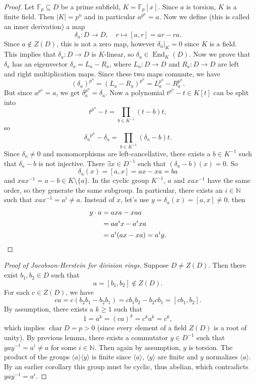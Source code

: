 \documentclass[10pt, a4paper]{article}
\newenvironment{noticeC}{%
  \tcolorbox[%
  notitle,
  empty,
  enhanced,  %
  breakable,
  coltext=black, 
  fontupper=\rmfamily,
  noparskip,
  sharp corners,
  boxrule=-1pt,  %
  frame hidden,
  left=7pt,  %
  right=7pt,
  top=5pt,
  bottom=5pt,
  before skip=2.5ex plus 2pt,
  after skip=2.5ex plus 2pt,
  overlay unbroken and last={%
  },
  ]}
{\endtcolorbox}
\newenvironment{myproof}%
  {\begin{noticeC}\begin{proof}}%
  {\end{proof}\end{noticeC}}
\newcommand{\N}{\mathbb {N}}
\newcommand{\F}{\mathbb {F}}
\DeclareMathOperator{\chara}{char}
\DeclareMathOperator{\en}{End}
\begin{document}
\begin{myproof}
  Let $\F_p  \subseteq D$ be a prime subfield, $K = \F_p [x]$.
  Since $a$ is torsion, $K$ is a finite field. Then $|K| = p^n$
  and in particular $a^{p^n} = a$.
  Now we define (this is called an inner derivation) a map
  $$\delta_a : D \to D,\quad r \mapsto [a, r] = ar - ra.$$
  Since $a \notin Z(D)$, this is not a zero map, however $\delta_a \big|_K = 0$
  since $K$ is a field. This implies that $\delta_a : D \to D$ is $K$-linear, so 
  $\delta_a \in \en_K (D)$. Now we prove that $\delta_a$ has an eigenvector 
  $\delta_a = L_a - R_a$, where $L_a : D \to D$ and $R_a : D \to D$ are left and right multiplication maps.
  Since these two maps commute, we have 
  $$(\delta_a)^{p^n} = (L_a - R_a)^{p^n} = L_a ^{p^n} - R_a ^{p^n}.$$
  But since $a^{p^n} = a$, we get $\delta_a ^{p^n} = \delta_a$.
  Now a polynomial $t^{p^n} - t \in K[t]$ can be split into 
  $$t^{p^n} - t = \prod_{b \in K^{-1}} (t - b) t,$$
  so $${\delta_a}^{p^n} - {\delta_a} = \prod_{b \in K^{-1}} ({\delta_a} - b) t.$$
  Since $\delta_a \neq 0$ and monomorphisms are left-cancellative, there exists a $b \in K^{-1}$
  such that $\delta_a - b$ is not injective.
  There $\exists x \in D^{-1}$ such that $(\delta_a - b)(x) = 0$.
  So $$\delta_a (x) = [a, x] = ax - xa = ba$$ and $x a x^{-1} = a - b \in K \setminus \{a\}$.
  In the cyclic group $K^{-1}$, $a$ and $x ax^{-1}$ have the same order, so they generate the same subgroup.
  In particular, there exists an $i \in \N$ such that $xax^{-1} = a^i \neq a$.
  Instead of $x$, let's use $y = \delta_a (x) = [a, x] \neq 0$.
  then
  \begin{align*}
    y \cdot a &= axa - xaa\\
    &= a a^i x - a^i x a\\
    &= a^i (ax - xa) = a^i y. \qedhere 
  \end{align*} 
\end{myproof}

\begin{myproof}[Proof of Jacobson-Herstein for division rings]
  Suppose $D \neq Z(D)$. Then there exist $b_1, b_2 \in D$ such that 
  $$a = [b_1, b_2] \notin Z(D).$$ For each $c \in Z(D)$, we have 
  $$ca = c(b_2 b_1 - b_2 b_1) = cb_1 b_2 - b_2 c b_1 = [cb_1, b_2].$$
  By assumption, there exists a $k \geq 1$ such that 
  $$1 = a^k = (ca)^k = c^k a^k = c^k,$$
  which implies $\chara D = p > 0$ (since every element of a field $Z(D)$ is a root of unity). By previous lemma,
  there exists a commutator $y \in D^{-1}$ such that $y a y^{-1} = a^i \neq a$ for some $i \in \N$.
  Then again by assumption, $y$ is torsion. The product of the groups $\langle a \rangle \langle y\rangle$
  is finite since $\langle a \rangle$, $\langle y \rangle$ are finite and $y$ normalizes $\langle a \rangle$.
  By an earlier corollary this group must be cyclic, thus abelian, which contradicts $y a y^{-1} = a^i$.
\end{myproof}
\end{document}
